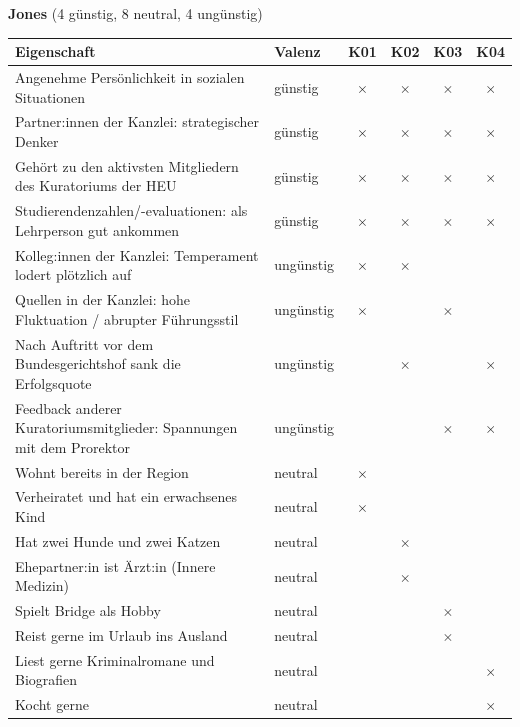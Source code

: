 \clearpage
\noindent\textbf{Jones} (4 günstig, 8 neutral, 4 ungünstig)
\begin{center}
  \setlength{\tabcolsep}{4pt}
  \begin{tabular}{@{}p{}lcccc@{}}
    \toprule
    Eigenschaft & Valenz & K01 & K02 & K03 & K04 \\
    \midrule
    Angenehme Persönlichkeit in sozialen Situationen
    & günstig & $\times$ & $\times$ & $\times$ & $\times$ \\
    Partner:innen der Kanzlei: strategischer Denker
    & günstig & $\times$ & $\times$ & $\times$ & $\times$ \\
    Gehört zu den aktivsten Mitgliedern des Kuratoriums der HEU
    & günstig & $\times$ & $\times$ & $\times$ & $\times$ \\
    Studierendenzahlen/-evaluationen: als Lehrperson gut ankommen
    & günstig & $\times$ & $\times$ & $\times$ & $\times$ \\
    \midrule
    Kolleg:innen der Kanzlei: Temperament lodert plötzlich auf
    & ungünstig & $\times$ & $\times$ &  &  \\
    Quellen in der Kanzlei: hohe Fluktuation / abrupter Führungsstil
    & ungünstig & $\times$ &  & $\times$ &  \\
    Nach Auftritt vor dem Bundesgerichtshof sank die Erfolgsquote
    & ungünstig &  & $\times$ &  & $\times$ \\
    Feedback anderer Kuratoriumsmitglieder: Spannungen mit dem Prorektor
    & ungünstig &  &  & $\times$ & $\times$ \\
    \midrule
    Wohnt bereits in der Region
    & neutral & $\times$ &  &  &  \\
    Verheiratet und hat ein erwachsenes Kind
    & neutral & $\times$ &  &  &  \\
    Hat zwei Hunde und zwei Katzen
    & neutral &  & $\times$ &  &  \\
    Ehepartner:in ist Ärzt:in (Innere Medizin)
    & neutral &  & $\times$ &  &  \\
    Spielt Bridge als Hobby
    & neutral &  &  & $\times$ &  \\
    Reist gerne im Urlaub ins Ausland
    & neutral &  &  & $\times$ &  \\
    Liest gerne Kriminalromane und Biografien
    & neutral &  &  &  & $\times$ \\
    Kocht gerne
    & neutral &  &  &  & $\times$ \\
    \bottomrule
  \end{tabular}
\end{center}
\normalsize